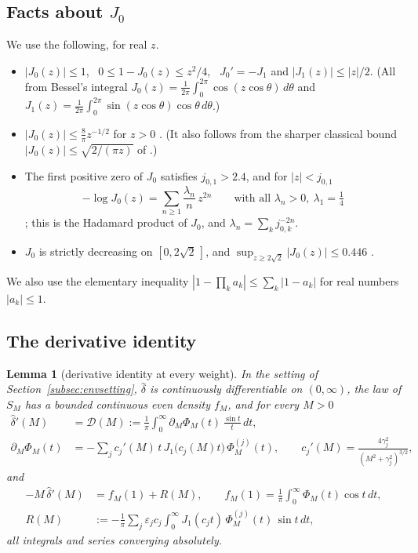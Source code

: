 \documentclass[11pt]{amsart}
\newtheorem{lemma}[theorem]{Lemma}
\theoremstyle{definition}
\numberwithin{equation}{section}
\newcommand{\eps}{\varepsilon}
\newcommand{\hd}{\widehat\delta}
\begin{document}
\subsection{Facts about \texorpdfstring{$J_0$}{J0}}\label{subsec:bessel}
We use the following, for real $z$.
\begin{itemize}
\item[(B1)] $|J_0(z)|\le1$, \ $0\le1-J_0(z)\le z^2/4$, \ $J_0'=-J_1$
and $|J_1(z)|\le|z|/2$. (All from Bessel's integral
$J_0(z)=\frac1{2\pi}\int_0^{2\pi}\cos(z\cos\theta)\,d\theta$ and
$J_1(z)=\frac1{2\pi}\int_0^{2\pi}\sin(z\cos\theta)\cos\theta\,d\theta$.)
\item[(B2)] $|J_0(z)|\le\frac8\pi z^{-1/2}$ for $z>0$
\cite[Lemma~4, (J2)]{WR}. (It also follows from the sharper classical
bound $|J_0(z)|\le\sqrt{2/(\pi z)}$ of \cite[\S13.74]{Wat44}.)
\item[(B3)] The first positive zero of $J_0$ satisfies $j_{0,1}>2.4$,
and for $|z|<j_{0,1}$
\[
-\log J_0(z)=\sum_{n\ge1}\frac{\lambda_n}{n}\,z^{2n}
\qquad\text{with all }\lambda_n>0,\ \lambda_1=\tfrac14
\]
\cite[Lemma~14(i), (iii)]{WR}; this is the Hadamard product of $J_0$,
and $\lambda_n=\sum_kj_{0,k}^{-2n}$.
\item[(B4)] $J_0$ is strictly decreasing on $[0,2\sqrt2\,]$, and
$\sup_{z\ge2\sqrt2}|J_0(z)|\le0.446$ \cite[Lemma~15(i), (ii)]{WR}.
\end{itemize}
We also use the elementary inequality
$|1-\prod_ka_k|\le\sum_k|1-a_k|$ for real numbers $|a_k|\le1$.

\subsection{The derivative identity}

\begin{lemma}[derivative identity at every weight]\label{lem:diff}
In the setting of Section~\ref{subsec:envsetting}, $\hd$ is
continuously differentiable on $(0,\infty)$, the law of $S_M$ has a
bounded continuous even density $f_M$, and for every $M>0$
\begin{equation}\label{eq:deriv}
\begin{aligned}
\hd'(M)&=\mathcal D(M):=\frac1\pi\int_0^\infty
\partial_M\Phi_M(t)\,\frac{\sin t}{t}\,dt,\\
\partial_M\Phi_M(t)&=-\sum_{j}c_j'(M)\,t\,J_1\bigl(c_j(M)t\bigr)\,
\Phi_M^{(j)}(t),\qquad c_j'(M)=\frac{4\gamma_j^2}{(M^2+\gamma_j^2)^{3/2}},
\end{aligned}
\end{equation}
and
\begin{equation}\label{eq:Did}
\begin{aligned}
-M\,\hd'(M)&=f_M(1)+R(M),\qquad
f_M(1)=\frac1\pi\int_0^\infty\Phi_M(t)\cos t\,dt,\\
R(M)&:=-\frac1\pi\sum_j\eps_jc_j\int_0^\infty J_1(c_jt)\,
\Phi_M^{(j)}(t)\,\sin t\,dt ,
\end{aligned}
\end{equation}
all integrals and series converging absolutely.
\end{lemma}
\end{document}
